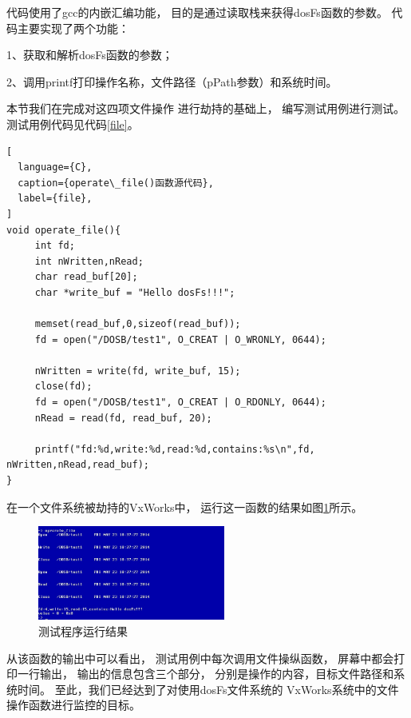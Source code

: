 代码使用了gcc的内嵌汇编功能，
目的是通过读取栈来获得dosFs函数的参数。
代码主要实现了两个功能：

1、获取和解析dosFs函数的参数；

2、调用printf打印操作名称，文件路径（pPath参数）和系统时间。

本节我们在完成对这四项文件操作
进行劫持的基础上，
编写测试用例进行测试。测试用例代码见代码\ref{file}。

\begin{lstlisting}[
  language={C},
  caption={operate\_file()函数源代码},
  label={file},
]
void operate_file(){
     int fd; 
     int nWritten,nRead;
     char read_buf[20]; 
     char *write_buf = "Hello dosFs!!!";

     memset(read_buf,0,sizeof(read_buf));
     fd = open("/DOSB/test1", O_CREAT | O_WRONLY, 0644);

     nWritten = write(fd, write_buf, 15);
     close(fd);
     fd = open("/DOSB/test1", O_CREAT | O_RDONLY, 0644);
     nRead = read(fd, read_buf, 20);

     printf("fd:%d,write:%d,read:%d,contains:%s\n",fd, nWritten,nRead,read_buf);
}
\end{lstlisting}


在一个文件系统被劫持的VxWorks中，
运行这一函数的结果如图\ref{after}所示。

\begin{figure}[h!]
    \centering
    \includegraphics[width=0.55\textwidth]{figure/after.jpg}
    \caption{测试程序运行结果}
    \label{after}
\end{figure}

从该函数的输出中可以看出，
测试用例中每次调用文件操纵函数，
屏幕中都会打印一行输出，
输出的信息包含三个部分，
分别是操作的内容，目标文件路径和系统时间。
至此，我们已经达到了对使用dosFs文件系统的
VxWorks系统中的文件操作函数进行监控的目标。











